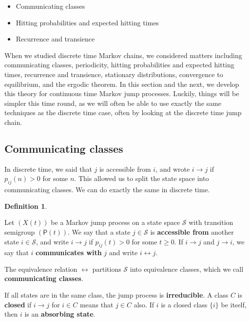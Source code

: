 \documentclass[
  a4paper,
]{article}
\providecommand{\tightlist}{%
  \setlength{\itemsep}{0pt}\setlength{\parskip}{0pt}}
\theoremstyle{definition}
\newtheorem{definition}{Definition}[section]
\theoremstyle{definition}
\theoremstyle{definition}
\theoremstyle{remark}
\begin{document}
\begin{itemize}
\tightlist
\item
  Communicating classes
\item
  Hitting probabilities and expected hitting times
\item
  Recurrence and transience
\end{itemize}

When we studied discrete time Markov chains, we considered matters including communicating classes, periodicity, hitting probabilities and expected hitting times, recurrence and transience, stationary distributions, convergence to equilibrium, and the ergodic theorem. In this section and the next, we develop this theory for continuous time Markov jump processes. Luckily, things will be simpler this time round, as we will often be able to use exactly the same techniques as the discrete time case, often by looking at the discrete time jump chain.

\hypertarget{classes-cont}{%
\subsection{Communicating classes}\label{classes-cont}}

In discrete time, we said that \(j\) is accessible from \(i\), and wrote \(i \to j\) if \(p_{ij}(n) > 0\) for some \(n\). This allowed us to split the state space into communicating classes. We can do exactly the same in discrete time.

\begin{definition}
\protect\hypertarget{def:classes2}{}\label{def:classes2}

Let \((X(t))\) be a Markov jump process on a state space \(\mathcal S\) with transition semigroup \((\mathsf P(t))\). We say that a state \(j \in \mathcal S\) is \textbf{accessible from} another state \(i \in \mathcal S\), and write \(i \to j\) if \(p_{ij}(t) > 0\) for some \(t \geq 0\). If \(i \to j\) and \(j \to i\), we say that \(i\) \textbf{communicates with} \(j\) and write \(i \leftrightarrow j\).

The equivalence relation \(\leftrightarrow\) partitions \(\mathcal S\) into equivalence classes, which we call \textbf{communicating classes}.

If all states are in the same class, the jump process is \textbf{irreducible}. A class \(C\) is \textbf{closed} if \(i \to j\) for \(i \in C\) means that \(j \in C\) also. If \(i\) is a closed class \(\{i\}\) be itself, then \(i\) is an \textbf{absorbing state}.

\end{definition}
\end{document}
